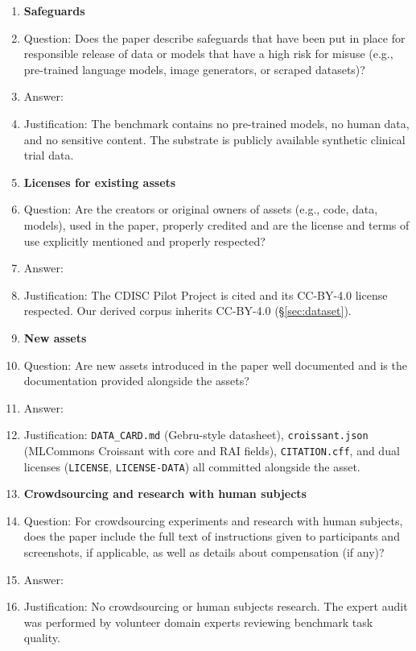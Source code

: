 \begin{enumerate}
\item {\bf Safeguards}
    \item[] Question: Does the paper describe safeguards that have been put in place for responsible release of data or models that have a high risk for misuse (e.g., pre-trained language models, image generators, or scraped datasets)?
    \item[] Answer: \answerNA{}
    \item[] Justification: The benchmark contains no pre-trained models, no human data, and no sensitive content. The substrate is publicly available synthetic clinical trial data.

\item {\bf Licenses for existing assets}
    \item[] Question: Are the creators or original owners of assets (e.g., code, data, models), used in the paper, properly credited and are the license and terms of use explicitly mentioned and properly respected?
    \item[] Answer: \answerYes{}
    \item[] Justification: The CDISC Pilot Project is cited and its CC-BY-4.0 license respected. Our derived corpus inherits CC-BY-4.0 (\S\ref{sec:dataset}).

\item {\bf New assets}
    \item[] Question: Are new assets introduced in the paper well documented and is the documentation provided alongside the assets?
    \item[] Answer: \answerYes{}
    \item[] Justification: \texttt{DATA\_CARD.md} (Gebru-style datasheet), \texttt{croissant.json} (MLCommons Croissant with core and RAI fields), \texttt{CITATION.cff}, and dual licenses (\texttt{LICENSE}, \texttt{LICENSE-DATA}) all committed alongside the asset.

\item {\bf Crowdsourcing and research with human subjects}
    \item[] Question: For crowdsourcing experiments and research with human subjects, does the paper include the full text of instructions given to participants and screenshots, if applicable, as well as details about compensation (if any)?
    \item[] Answer: \answerNA{}
    \item[] Justification: No crowdsourcing or human subjects research. The expert audit was performed by volunteer domain experts reviewing benchmark task quality.


\end{enumerate}
